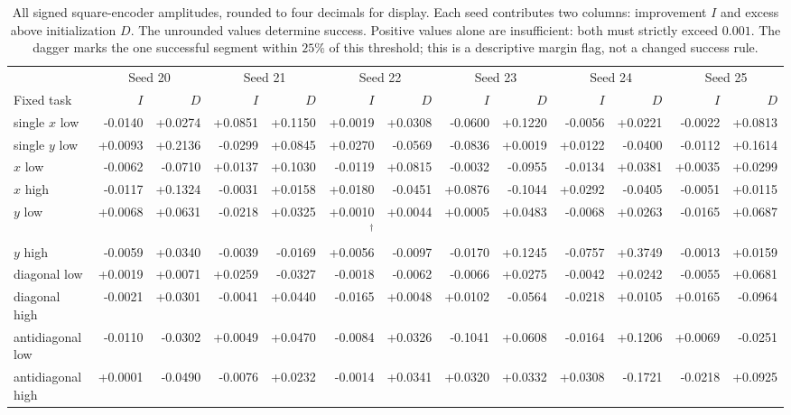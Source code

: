 \begin{table}[t]
\centering\footnotesize
\caption{All signed square-encoder amplitudes, rounded to four decimals for display. Each seed contributes two columns: improvement $I$ and excess above initialization $D$. The unrounded values determine success. Positive values alone are insufficient: both must strictly exceed $0.001$. The dagger marks the one successful segment within $25\%$ of this threshold; this is a descriptive margin flag, not a changed success rule.}
\label{supp:all-rebound-gaps}
\setlength{\tabcolsep}{2pt}
\begin{tabular}{lrrrrrrrrrrrr}
\toprule
&\multicolumn{2}{c}{Seed 20}&\multicolumn{2}{c}{Seed 21}&\multicolumn{2}{c}{Seed 22}&\multicolumn{2}{c}{Seed 23}&\multicolumn{2}{c}{Seed 24}&\multicolumn{2}{c}{Seed 25}\\
Fixed task&$I$&$D$&$I$&$D$&$I$&$D$&$I$&$D$&$I$&$D$&$I$&$D$\\\midrule
single $x$ low&-0.0140&+0.0274&+0.0851&+0.1150&+0.0019&+0.0308&-0.0600&+0.1220&-0.0056&+0.0221&-0.0022&+0.0813\\
single $y$ low&+0.0093&+0.2136&-0.0299&+0.0845&+0.0270&-0.0569&-0.0836&+0.0019&+0.0122&-0.0400&-0.0112&+0.1614\\
$x$ low&-0.0062&-0.0710&+0.0137&+0.1030&-0.0119&+0.0815&-0.0032&-0.0955&-0.0134&+0.0381&+0.0035&+0.0299\\
$x$ high&-0.0117&+0.1324&-0.0031&+0.0158&+0.0180&-0.0451&+0.0876&-0.1044&+0.0292&-0.0405&-0.0051&+0.0115\\
$y$ low&+0.0068&+0.0631&-0.0218&+0.0325&+0.0010$^{\dagger}$&+0.0044&+0.0005&+0.0483&-0.0068&+0.0263&-0.0165&+0.0687\\
$y$ high&-0.0059&+0.0340&-0.0039&-0.0169&+0.0056&-0.0097&-0.0170&+0.1245&-0.0757&+0.3749&-0.0013&+0.0159\\
diagonal low&+0.0019&+0.0071&+0.0259&-0.0327&-0.0018&-0.0062&-0.0066&+0.0275&-0.0042&+0.0242&-0.0055&+0.0681\\
diagonal high&-0.0021&+0.0301&-0.0041&+0.0440&-0.0165&+0.0048&+0.0102&-0.0564&-0.0218&+0.0105&+0.0165&-0.0964\\
antidiagonal low&-0.0110&-0.0302&+0.0049&+0.0470&-0.0084&+0.0326&-0.1041&+0.0608&-0.0164&+0.1206&+0.0069&-0.0251\\
antidiagonal high&+0.0001&-0.0490&-0.0076&+0.0232&-0.0014&+0.0341&+0.0320&+0.0332&+0.0308&-0.1721&-0.0218&+0.0925\\
\bottomrule
\end{tabular}
\end{table}

